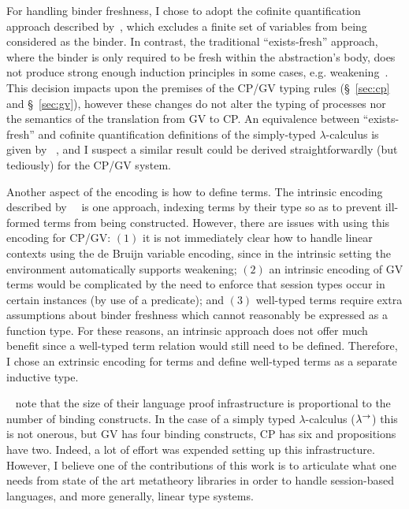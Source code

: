 For handling binder freshness, I chose to adopt the cofinite quantification
approach described by~\citeauthor{Aydemir:2008:EFM}, which excludes a finite
set of variables from being considered as the binder. In contrast, the
traditional ``exists-fresh'' approach, where the binder is only required to be
fresh within the abstraction's body, does not produce strong enough induction
principles in some cases, e.g. weakening~\cite{Aydemir:2008:EFM}. This
decision impacts upon the premises of the CP/GV typing rules (\S~\ref{sec:cp}
and \S~\ref{sec:gv}), however these changes do not alter the typing of
processes nor the semantics of the translation from GV to CP. An equivalence
between ``exists-fresh'' and cofinite quantification definitions of the
simply-typed $\lambda$-calculus is given by
\citeauthor{Aydemir:2008:EFM}~\cite{Aydemir:2008:EFM}, and I suspect a similar
result could be derived straightforwardly (but tediously) for the CP/GV
system.

Another aspect of the encoding is how to define terms. The intrinsic encoding
described by~\citeauthor{Benton:2012:STT}~\cite{Benton:2012:STT} is one
approach, indexing terms by their type so as to prevent ill-formed terms from
being constructed. However, there are issues with using this encoding for
CP/GV: $(1)$ it is not immediately clear how to handle linear contexts using
the de Bruijn variable encoding, since in the intrinsic setting the
environment automatically supports weakening; $(2)$ an intrinsic encoding of
GV terms would be complicated by the need to enforce that session types occur
in certain instances (by use of a predicate); and $(3)$ well-typed terms
require extra assumptions about binder freshness which cannot reasonably be
expressed as a function type. For these reasons, an intrinsic approach does
not offer much benefit since a well-typed term relation would still need to be
defined. Therefore, I chose an extrinsic encoding for terms and define
well-typed terms as a separate inductive type.

\citeauthor{Aydemir:2008:EFM}~\cite{Aydemir:2008:EFM} note that the size of
their language proof infrastructure is proportional to the number of binding
constructs. In the case of a simply typed $\lambda$-calculus ($\lambda^\rightarrow$) this is
not onerous, but GV has four binding constructs, CP has six and propositions
have two. Indeed, a lot of effort was expended setting up this
infrastructure. However, I believe one of the contributions of this work is to
articulate what one needs from state of the art metatheory libraries in order
to handle session-based languages, and more generally, linear type systems.

